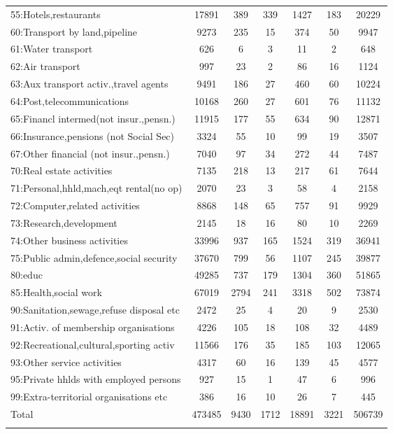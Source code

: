 {\begin{longtable}{l*{6}{c}}
55:Hotels,restaurants&    17891&      389&      339&     1427&      183&    20229\\
60:Transport by land,pipeline&     9273&      235&       15&      374&       50&     9947\\
61:Water transport&      626&        6&        3&       11&        2&      648\\
62:Air transport&      997&       23&        2&       86&       16&     1124\\
63:Aux transport activ.,travel agents&     9491&      186&       27&      460&       60&    10224\\
64:Post,telecommunications&    10168&      260&       27&      601&       76&    11132\\
65:Financl intermed(not insur.,pensn.)&    11915&      177&       55&      634&       90&    12871\\
66:Insurance,pensions (not Social Sec)&     3324&       55&       10&       99&       19&     3507\\
67:Other financial (not insur.,pensn.)&     7040&       97&       34&      272&       44&     7487\\
70:Real estate activities&     7135&      218&       13&      217&       61&     7644\\
71:Personal,hhld,mach,eqt rental(no op)&     2070&       23&        3&       58&        4&     2158\\
72:Computer,related activities&     8868&      148&       65&      757&       91&     9929\\
73:Research,development&     2145&       18&       16&       80&       10&     2269\\
74:Other business activities&    33996&      937&      165&     1524&      319&    36941\\
75:Public admin,defence,social security&    37670&      799&       56&     1107&      245&    39877\\
80:educ   &    49285&      737&      179&     1304&      360&    51865\\
85:Health,social work&    67019&     2794&      241&     3318&      502&    73874\\
90:Sanitation,sewage,refuse disposal etc&     2472&       25&        4&       20&        9&     2530\\
91:Activ. of membership organisations&     4226&      105&       18&      108&       32&     4489\\
92:Recreational,cultural,sporting activ&    11566&      176&       35&      185&      103&    12065\\
93:Other service activities&     4317&       60&       16&      139&       45&     4577\\
95:Private hhlds with employed persons&      927&       15&        1&       47&        6&      996\\
99:Extra-territorial organisations etc&      386&       16&       10&       26&        7&      445\\
Total     &   473485&     9430&     1712&    18891&     3221&   506739\\
\hline\hline
\label{tab:2D_industries}
\end{longtable}
}
